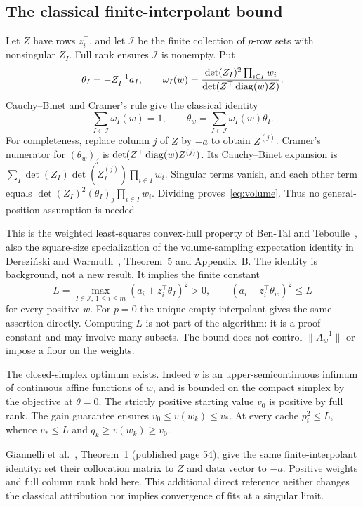 \documentclass[11pt]{article}
\begin{document}
\subsection{The classical finite-interpolant bound}
Let $Z$ have rows $z_i^\top$, and let $\mathcal I$ be the finite collection of $p$-row sets with nonsingular $Z_I$. Full rank ensures $\mathcal I$ is nonempty. Put
\[
 \theta_I=-Z_I^{-1}a_I,\qquad
 \omega_I(w)=\frac{\det(Z_I)^2\prod_{i\in I}w_i}{\det(Z^\top\operatorname{diag}(w)Z)}.
\]
Cauchy--Binet and Cramer's rule give the classical identity
\begin{equation}\label{eq:volume}
 \sum_{I\in\mathcal I}\omega_I(w)=1,\qquad
 \theta_w=\sum_{I\in\mathcal I}\omega_I(w)\theta_I.
\end{equation}
For completeness, replace column $j$ of $Z$ by $-a$ to obtain $Z^{(j)}$. Cramer's numerator for $(\theta_w)_j$ is $\det(Z^\top\operatorname{diag}(w)Z^{(j)})$. Its Cauchy--Binet expansion is
$\sum_I\det(Z_I)\det(Z_I^{(j)})\prod_{i\in I}w_i$.
Singular terms vanish, and each other term equals
$\det(Z_I)^2(\theta_I)_j\prod_{i\in I}w_i$.
Dividing proves~\eqref{eq:volume}. Thus no general-position assumption is needed.

This is the weighted least-squares convex-hull property of Ben-Tal and Teboulle~\cite{bental1990}, also the square-size specialization of the volume-sampling expectation identity in Derezi\'nski and Warmuth~\cite{derezinski2018}, Theorem~5 and Appendix~B. The identity is background, not a new result. It implies the finite constant
\begin{equation}\label{eq:uniformL}
 L=\max_{I\in\mathcal I,\,1\le i\le m}(a_i+z_i^\top\theta_I)^2>0,
 \qquad (a_i+z_i^\top\theta_w)^2\le L
\end{equation}
for every positive $w$. For $p=0$ the unique empty interpolant gives the same assertion directly. Computing $L$ is not part of the algorithm: it is a proof constant and may involve many subsets. The bound does not control $\|A_w^{-1}\|$ or impose a floor on the weights.

The closed-simplex optimum exists. Indeed $v$ is an upper-semicontinuous infimum of continuous affine functions of $w$, and is bounded on the compact simplex by the objective at $\theta=0$. The strictly positive starting value $v_0$ is positive by full rank. The gain guarantee ensures $v_0\le v(w_k)\le v_*$. At every cache $p_i^2\le L$, whence $v_*\le L$ and $q_k\ge v(w_k)\ge v_0$.

Giannelli et al.~\cite{giannelli2024}, Theorem~1 (published page 54), give the same finite-interpolant identity: set their collocation matrix to $Z$ and data vector to $-a$. Positive weights and full column rank hold here. This additional direct reference neither changes the classical attribution nor implies convergence of fits at a singular limit.
\end{document}
